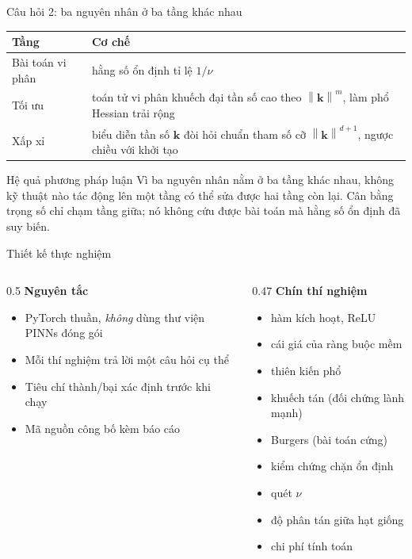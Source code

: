 \documentclass[aspectratio=169,11pt]{beamer}
\newcommand{\bk}{\bm{k}}
\newcommand{\norm}[1]{\left\lVert #1 \right\rVert}
\begin{document}
\begin{frame}{Câu hỏi 2: ba nguyên nhân ở ba tầng khác nhau}
\small
\begin{table}
\small
\begin{tabular}{@{}lp{7.6cm}@{}}
\toprule
\textbf{Tầng} & \textbf{Cơ chế} \\
\midrule
Bài toán vi phân & hằng số ổn định tỉ lệ $1/\nu$ \\[2pt]
Tối ưu & toán tử vi phân khuếch đại tần số cao theo $\norm{\bk}^m$,
  làm phổ Hessian trải rộng \\[2pt]
Xấp xỉ & biểu diễn tần số $\bk$ đòi hỏi chuẩn tham số cỡ $\norm{\bk}^{d+1}$,
  ngược chiều với khởi tạo \\
\bottomrule
\end{tabular}
\end{table}

\medskip
\begin{alertblock}{Hệ quả phương pháp luận}
Vì ba nguyên nhân nằm ở ba tầng khác nhau,
\alert{không kỹ thuật nào tác động lên một tầng có thể sửa được hai tầng còn lại.}
Cân bằng trọng số chỉ chạm tầng giữa; nó không cứu được bài toán mà hằng số
ổn định đã suy biến.
\end{alertblock}
\end{frame}

\begin{frame}{Thiết kế thực nghiệm}
\begin{columns}[T]
\begin{column}{0.5\textwidth}
\textbf{Nguyên tắc}
\begin{itemize}
\item PyTorch thuần, \emph{không} dùng thư viện PINNs đóng gói
\item Mỗi thí nghiệm trả lời một câu hỏi cụ thể
\item Tiêu chí thành/bại xác định \alert{trước} khi chạy
\item Mã nguồn công bố kèm báo cáo
\end{itemize}
\end{column}
\begin{column}{0.47\textwidth}
\textbf{Chín thí nghiệm}
\begin{itemize}\footnotesize
\item[TN1] hàm kích hoạt, ReLU
\item[TN2] cái giá của ràng buộc mềm
\item[TN3] thiên kiến phổ
\item[TN4] khuếch tán (đối chứng lành mạnh)
\item[TN5] Burgers (bài toán cứng)
\item[TN6] kiểm chứng chặn ổn định
\item[TN7] quét $\nu$
\item[TN8] độ phân tán giữa hạt giống
\item[TN9] chi phí tính toán
\end{itemize}
\end{column}
\end{columns}
\end{frame}
\end{document}
